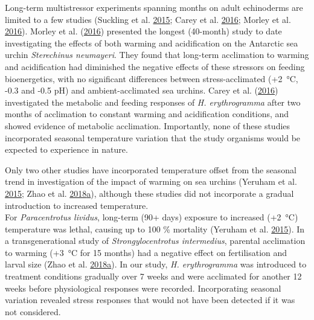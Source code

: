 \documentclass[a4paper,10pt, oneside]{memoir}
\begin{document}
Long-term multistressor experiments spanning months on adult echinoderms are limited to a few studies (Suckling et al. \protect\hyperlink{ref-Suckling2015}{2015}; Carey et al. \protect\hyperlink{ref-Carey2016}{2016}; Morley et al. \protect\hyperlink{ref-Morley2016}{2016}).
Morley et al. (\protect\hyperlink{ref-Morley2016}{2016}) presented the longest (40-month) study to date investigating the effects of both warming and acidification on the Antarctic sea urchin \textit{Sterechinus neumayeri}.
They found that long-term acclimation to warming and acidification had diminished the negative effects of these stressors on feeding bioenergetics, with no significant differences between stress-acclimated (+\SI{2}{\celsius}, -0.3 and -0.5 pH) and ambient-acclimated sea urchins.
Carey et al. (\protect\hyperlink{ref-Carey2016}{2016}) investigated the metabolic and feeding responses of \textit{H. erythrogramma} after two months of acclimation to constant warming and acidification conditions, and showed evidence of metabolic acclimation.
Importantly, none of these studies incorporated seasonal temperature variation that the study organisms would be expected to experience in nature.

Only two other studies have incorporated temperature offset from the seasonal trend in investigation of the impact of warming on sea urchins (Yeruham et al. \protect\hyperlink{ref-Yeruham2015}{2015}; Zhao et al. \protect\hyperlink{ref-Zhao2018}{2018}\protect\hyperlink{ref-Zhao2018}{a}), although these studies did not incorporate a gradual introduction to increased temperature.\\
For \textit{Paracentrotus lividus}, long-term (90+ days) exposure to increased (+\SI{2}{\celsius}) temperature was lethal, causing up to 100 \% mortality (Yeruham et al. \protect\hyperlink{ref-Yeruham2015}{2015}).
In a transgenerational study of \textit{Strongylocentrotus intermedius}, parental acclimation to warming (+\SI{3}{\celsius} for 15 months) had a negative effect on fertilisation and larval size (Zhao et al. \protect\hyperlink{ref-Zhao2018}{2018}\protect\hyperlink{ref-Zhao2018}{a}).
In our study, \textit{H. erythrogramma} was introduced to treatment conditions gradually over 7 weeks and were acclimated for another 12 weeks before physiological responses were recorded.
Incorporating seasonal variation revealed stress responses that would not have been detected if it was not considered.
\end{document}
